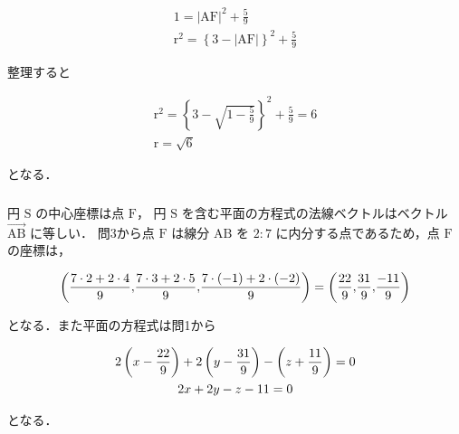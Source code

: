 \begin{gather*}
  1 = {\lvert\mathrm{AF}\lvert}^2 + \frac{5}{9} \\
  {\mathrm{r}}^2 = \left\{3 - \lvert\mathrm{AF}\lvert\right\}^2 + \frac{5}{9}
\end{gather*}

整理すると

\begin{gather*}
  {\mathrm{r}}^2 = \left\{3 - \sqrt{1 - \frac{5}{9}}\right\}^2 + \frac{5}{9} = 6 \\
  \mathrm{r} = \sqrt{6}
\end{gather*}

となる．

\subsubsection{}

円 $\mathrm{S}$ の中心座標は点 $\mathrm{F}$，
円 $\mathrm{S}$ を含む平面の方程式の法線ベクトルはベクトル 
$\overrightarrow{\mathrm{AB}}$ に等しい．
問3から点 $\mathrm{F}$ は線分 $\mathrm{AB}$ を $2\colon7$ に内分する点であるため，点 $\mathrm{F}$ の座標は，

\begin{gather*}
  \left\lparen {\frac{7 \cdot 2 + 2 \cdot 4}{9}} {,}
  {\frac{7 \cdot 3 + 2 \cdot 5}{9}} {,}
  {\frac{7 \cdot (-1) + 2 \cdot (-2)}{9}} \right\rparen
  =\left\lparen {\frac{22}{9}} {,}
  {\frac{31}{9}} {,}
  {\frac{-11}{9}} \right\rparen
\end{gather*}

となる．また平面の方程式は問1から

\begin{gather*}
  2 \left\lparen x - \frac{22}{9} \right\rparen +
  2 \left\lparen y - \frac{31}{9} \right\rparen -
  \left\lparen z + \frac{11}{9} \right\rparen = 0 \\
  2 x + 2 y - z - 11 = 0
\end{gather*}

となる．


\subsection{}

\subsection{}